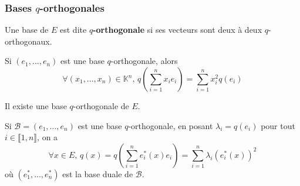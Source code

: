   \subsubsection{Bases \texorpdfstring{$q$}{q}-orthogonales}


  \begin{definition}
    Une base de $E$ est dite \textbf{$q$-orthogonale} si ses vecteurs sont deux à deux $q$-orthogonaux.
  \end{definition}

  \begin{remark}
    Si $(e_1, \dots, e_n)$ est une base $q$-orthogonale, alors
    \[ \forall (x_1, \dots, x_n) \in \mathbb{K}^n, \, q \left( \sum_{i=1}^n x_i e_i \right) = \sum_{i=1}^n x_i^2 q(e_i) \]
  \end{remark}

  \begin{theorem}
    Il existe une base $q$-orthogonale de $E$.
  \end{theorem}

  \begin{remark}
    Si $\mathcal{B} = (e_1, \dots, e_n)$ est une base $q$-orthogonale, en posant $\lambda_i = q(e_i)$ pour tout $i \in \llbracket 1, n \rrbracket$, on a
    \[ \forall x \in E, \, q(x) = q \left( \sum_{i=1}^n e_i^*(x) e_i \right) = \sum_{i=1}^n \lambda_i (e_i^*(x))^2 \]
    où $(e_1^*, \dots, e_n^*)$ est la base duale de $\mathcal{B}$.
  \end{remark}

